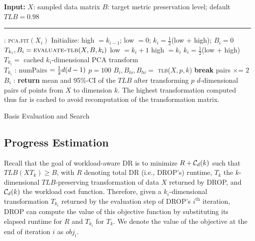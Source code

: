 \begin{algorithm}
\begin{algorithmic}[1]
\small
\Statex \textbf{Input:}  
\Statex $X$: sampled data matrix
\Statex $B$: target metric preservation level; default $TLB = 0.98$
\Statex  \hrule 
{}: \label{eq:basis}
	\State \textsc{pca.fit}$(X_i)$
	\State Initialize: high $= k_{i-1}$; low $=0$; $k_i= \frac{1}{2}$(low + high); $B_i = 0$
		\State $T_{k_i}, B_i  = \textsc{evaluate-tlb}( X, B, k_i)$
		  low $= k_i + 1$ 
		\Else  \hspace{0pt} high $= k_i $
		\EndIf
		\State $k_i = \frac{1}{2}$(low + high)
	\EndWhile
	\State $T_{k_i} = $ cached $k_i$-dimensional PCA transform\\
	\Return $T_{k_i}$
\EndFunction
\Statex 
{}: \label{eq:eval}
	\State numPairs $= \frac{1}{2}{\color{black}d}({\color{black}d}-1)$
	\State $p = 100$
		\State $B_i, B_{lo}, B_{hi} = $ \textsc{tlb}($ X, p, k$)
			 \label{eq:paircheck}
		   \textbf{break}
		\Else \hspace{0pt} pairs $\times$= $ 2$
		\EndIf
	\EndWhile
	\\\Return $B_i$	
\EndFunction
\Statex 
{}: \label{eq:tlbeval}
	\State \textbf{return } mean and 95\%-CI of the $TLB$ after transforming $p$ $d$-dimensional pairs of points from $X$ to dimension $k$. The highest transformation computed thus far is cached to avoid recomputation of the transformation matrix.
\EndFunction

\end{algorithmic}
\caption{Basis Evaluation and Search}
\label{alg:candidate}
\end{algorithm}


\subsection{Progress Estimation}
\label{subsec:pest}

Recall that the goal of workload-aware DR is to minimize $R + \mathcal{C}_{\color{black}d}(k)$ such that $TLB(XT_k) \geq B$, with $R$ denoting total DR (i.e., DROP's) runtime, $T_k$ the $k$-dimensional $TLB$-preserving transformation of data $X$ returned by DROP, and $\mathcal{C}_{\color{black}d}(k)$ the workload cost function. 
Therefore, given a $k_i$-dimensional transformation $T_{k_i}$ returned by the evaluation step of DROP's $i^{\text{th}}$ iteration, DROP can compute the value of this objective function by substituting its elapsed runtime for $R$ and $T_{k_i}$ for $T_k$.  
We denote the value of the objective at the end of iteration $i$ as $obj_i$. 

